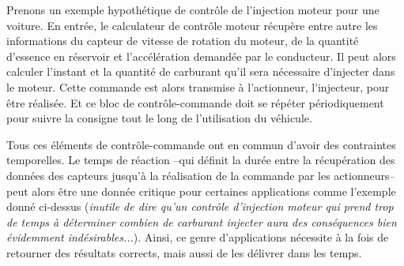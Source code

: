 \documentclass[french, a4paper, 11pt, twoside, pdftex]{StyleThese}
\begin{document}
	Prenons un exemple hypothétique de contrôle de l'injection moteur pour une voiture. En entrée, le calculateur de contrôle moteur récupère entre autre les informations du capteur de vitesse de rotation du moteur, de la quantité d'essence en réservoir et l'accélération demandée par le conducteur. Il peut alors calculer l'instant et la quantité de carburant qu'il sera nécessaire d'injecter dans le moteur. Cette commande est alors transmise à l'actionneur, l'injecteur, pour être réalisée. Et ce bloc de contrôle-commande doit se répéter périodiquement pour suivre la consigne tout le long de l'utilisation du véhicule.
		
	Tous ces éléments de contrôle-commande ont en commun d'avoir des contraintes temporelles. Le temps de réaction --qui définit la durée entre la récupération des données des capteurs jusqu'à la réalisation de la commande par les actionneurs--  peut alors être une donnée critique pour certaines applications comme l'exemple donné ci-dessus (\textit{inutile de dire qu'un contrôle d'injection moteur qui prend trop de temps à déterminer combien de carburant injecter aura des conséquences bien évidemment indésirables...}). Ainsi, ce genre d'applications nécessite à la fois de retourner des résultats corrects, mais aussi de les délivrer dans les temps. 
		
\end{document}
